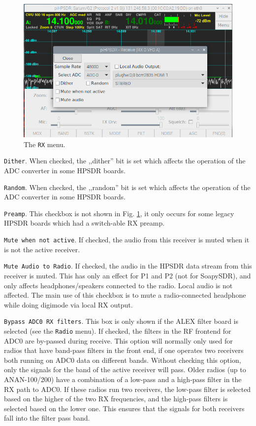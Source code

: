 \documentclass[12pt]{book}
\def\rett#1{\texttt{\color{red}#1}}
\def\bltt#1{\texttt{\color{blue}#1}}
\begin{document}
\begin{figure}[ht!]
\center
\includegraphics[width=12cm]{RXMenu.png}
\caption{The \bltt{RX} menu.}
\label{fig:RXMenu}
\end{figure}

\rett{Dither}. When checked, the ,,dither'' bit is set which affects the operation of
the ADC converter in some HPSDR boards.

\rett{Random}. When checked, the ,,random'' bit is set which affects the operation of
the ADC converter in some HPSDR boards.

\rett{Preamp}. This checkbox is not shown in Fig. \ref{fig:RXMenu}, it only occurs
for some legacy HPSDR boards which had a switch-able RX preamp.

\rett{Mute when not active}. If checked, the audio from this receiver is muted when
it is not the active receiver.

\rett{Mute Audio to Radio}. If checked, the audio in the HPSDR data stream from this receiver is muted.
This has only an effect for P1 and P2 (not for SoapySDR), and only affects headphones/speakers
connected to the radio. Local audio is not affected. The main use of this checkbox is
to mute a radio-connected headphone while doing digimode via local RX output.

\rett{Bypass ADC0 RX filters}. This box is only shown if the ALEX filter board
is selected (see the \bltt{Radio} menu). If checked, the filters in the RF frontend for ADC0
are by-passed during receive. This option will normally only used for radios that
have band-pass filters in the front end, if one operates two receivers both running
on ADC0 data on different bands. Without checking this option, only the signals for
the band of the active receiver will pass. Older radios (up to ANAN-100/200)  have a
combination of a low-pass and a high-pass filter in the RX path to ADC0. If these
radios run two receivers, the low-pass filter is selected based on the higher
of the two RX frequencies, and the high-pass filters is selected based on the
lower one. This ensures that the signals for both receivers fall into  the filter
pass band.
\end{document}
